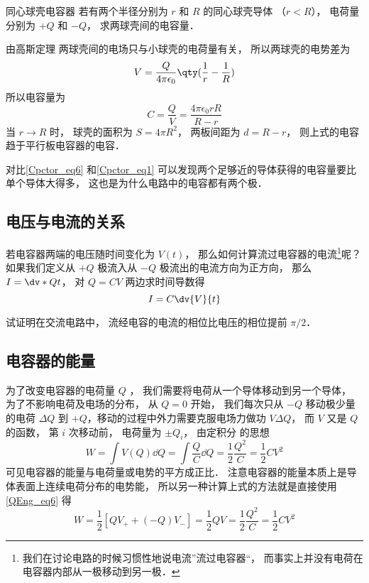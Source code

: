 \begin{exam}{同心球壳电容器}
若有两个半径分别为 $r$ 和 $R$ 的同心球壳导体 （$r < R$）， 电荷量分别为 $+Q$ 和 $-Q$， 求两球壳间的电容量．

由高斯定理%
两球壳间的电场只与小球壳的电荷量有关， 所以两球壳的电势差为
\begin{equation}
V = \frac{Q}{4\pi\epsilon_0} \qty(\frac 1r - \frac 1R)
\end{equation}
所以电容量为
\begin{equation}\label{Cpctor_eq6}
C = \frac QV = \frac{4\pi\epsilon_0 rR}{R - r}
\end{equation}
当 $r\to R$ 时， 球壳的面积为 $S = 4\pi R^2$， 两板间距为 $d = R - r$， 则上式的电容趋于平行板电容器的电容．
\end{exam}

对比\autoref{Cpctor_eq6} 和\autoref{Cpctor_eq1} 可以发现两个足够近的导体获得的电容量要比单个导体大得多， 这也是为什么电路中的电容都有两个极．

\subsection{电压与电流的关系}
若电容器两端的电压随时间变化为 $V(t)$， 那么如何计算流过电容器的电流\footnote{我们在讨论电路的时候习惯性地说电流”流过电容器“， 而事实上并没有电荷在电容器内部从一极移动到另一极．}呢？ 如果我们定义从 $+Q$ 极流入从 $-Q$ 极流出的电流方向为正方向， 那么 $I = \dv*{Q}{t}$， 对 $Q = CV$ 两边求时间导数得
\begin{equation}
I = C\dv{V}{t}
\end{equation}
\begin{exer}{}
试证明在交流电路中， 流经电容的电流的相位比电压的相位提前 $\pi/2$．
\end{exer}

\subsection{电容器的能量}
为了改变电容器的电荷量 $Q$ ， 我们需要将电荷从一个导体移动到另一个导体， 为了不影响电荷及电场的分布， 从 $Q = 0$ 开始， 我们每次只从 $-Q$ 移动极少量的电荷 $\Delta Q$ 到 $+Q$，移动的过程中外力需要克服电场力做功 $V\Delta Q$， 而 $V$ 又是 $Q$ 的函数， 第 $i$ 次移动前， 电荷量为 $\pm Q_i$， 由定积分 的思想
\begin{equation}
W = \int V(Q) \dd{Q} = \int \frac{Q}{C} \dd{Q} = \frac12 \frac{Q^2}{C} = \frac12 CV^2
\end{equation}
可见电容器的能量与电荷量或电势的平方成正比． 注意电容器的能量本质上是导体表面上连续电荷分布的电势能， 所以另一种计算上式的方法就是直接使用\autoref{QEng_eq6} 得
\begin{equation}
W = \frac12 [QV_+ + (-Q)V_-] = \frac12 QV = \frac12 \frac{Q^2}{C} = \frac12 CV^2 
\end{equation}


